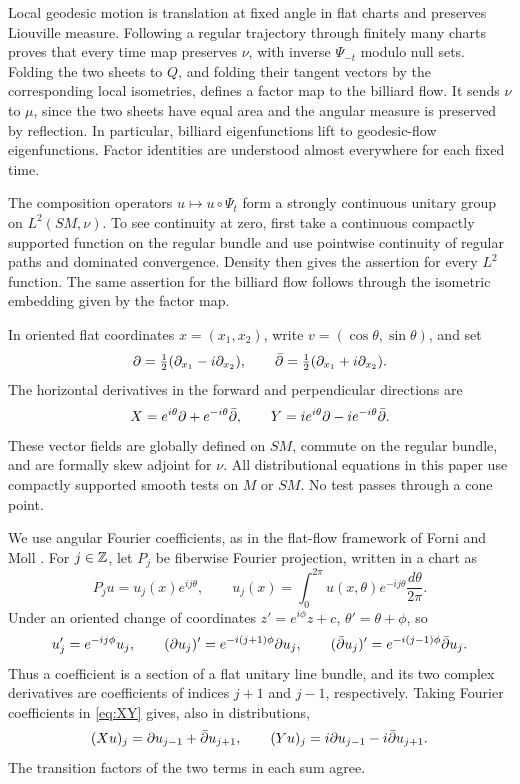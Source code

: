 Local geodesic motion is translation at fixed angle in flat charts and
preserves Liouville measure. Following a regular trajectory through
finitely many charts proves that every time map preserves \(\nu\),
with inverse \(\Psi_{-t}\) modulo null sets. Folding the two sheets to
\(Q\), and folding their tangent vectors by the corresponding local
isometries, defines a factor map to the billiard flow. It sends \(\nu\)
to \(\mu\), since the two sheets have equal area and the angular
measure is preserved by reflection. In particular, billiard
eigenfunctions lift to geodesic-flow eigenfunctions. Factor identities
are understood almost everywhere for each fixed time.

The composition operators \(u\mapsto u\circ\Psi_t\) form a strongly
continuous unitary group on \(L^2(SM,\nu)\). To see continuity at zero,
first take a continuous compactly supported function on the regular
bundle and use pointwise continuity of regular paths and dominated
convergence. Density then gives the assertion for every \(L^2\)
function. The same assertion for the billiard flow follows through
the isometric embedding given by the factor map.

In oriented flat coordinates \(x=(x_1,x_2)\), write
\(v=(\cos\theta,\sin\theta)\), and set
\[
 \partial=\tfrac12(\partial_{x_1}-i\partial_{x_2}),\qquad
 \bar\partial=\tfrac12(\partial_{x_1}+i\partial_{x_2}).
\]
The horizontal derivatives in the forward and perpendicular directions
are
\begin{equation}\label{eq:XY}
 X=e^{i\theta}\partial+e^{-i\theta}\bar\partial,\qquad
 Y=i e^{i\theta}\partial-i e^{-i\theta}\bar\partial.
\end{equation}
These vector fields are globally defined on \(SM\), commute on the
regular bundle, and are formally skew adjoint for \(\nu\).
All distributional equations in this paper use compactly supported
smooth tests on \(M\) or \(SM\). No test passes through a cone point.

We use angular Fourier coefficients, as in the flat-flow framework of
Forni and Moll \cite[Sections~3.2--3.5]{FM}. For \(j\in\mathbb Z\), let
\(P_j\) be fiberwise Fourier projection, written in a chart as
\[
 P_j u=u_j(x)e^{ij\theta},\qquad
 u_j(x)=\int_0^{2\pi}u(x,\theta)e^{-ij\theta}\frac{d\theta}{2\pi}.
\]
Under an oriented change of coordinates \(z'=e^{i\phi}z+c\),
\(\theta'=\theta+\phi\), so
\[
 u'_j=e^{-ij\phi}u_j,\qquad
 (\partial u_j)'=e^{-i(j+1)\phi}\partial u_j,\qquad
 (\bar\partial u_j)'=e^{-i(j-1)\phi}\bar\partial u_j.
\]
Thus a coefficient is a section of a flat unitary line bundle, and its
two complex derivatives are coefficients of indices \(j+1\) and
\(j-1\), respectively. Taking Fourier coefficients in
\eqref{eq:XY} gives, also in distributions,
\begin{equation}\label{eq:modes}
 (Xu)_j=\partial u_{j-1}+\bar\partial u_{j+1},\qquad
 (Yu)_j=i\partial u_{j-1}-i\bar\partial u_{j+1}.
\end{equation}
The transition factors of the two terms in each sum agree.

